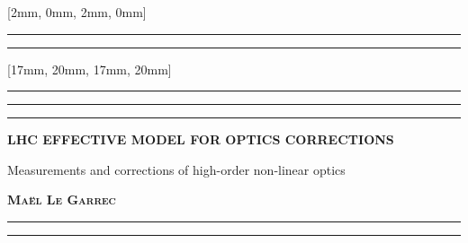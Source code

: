 \documentclass[coverheight=240mm,
               coverwidth=175mm, 
               spinewidth=15mm,
               markcolor=black,
               bleedwidth=0mm,
               marklength=0mm]{bookcover}
\begin{document}
    
\begin{bookcover}


\color{textcolor}


[2mm, 0mm, 2mm, 0mm]{
    \noindent\rule[0.5em]{\partwidth}{1.5pt}
    \vfill
    \vfill
    \noindent\rule[0.5em]{\partwidth}{1.5pt}
}


[17mm, 20mm, 17mm, 20mm] %
{
    \noindent\rule[0.5em]{\partwidth}{1.5pt}\vspace{-22pt}
    \noindent\rule[0.5em]{\partwidth}{1.5pt}\vspace{-22pt}
    \noindent\rule[0.5em]{\partwidth}{1.5pt}
    \vspace{0.5cm}
    \fontsize{31pt}{30pt}\selectfont%
    \begin{flushright}%
        \bfseries
        \MakeUppercase{
            LHC Effective Model for Optics Corrections
        }%
    \end{flushright}
    \vspace{.1em}
    \fontsize{12pt}{15pt}\selectfont%
    \begin{flushright}%
        Measurements and corrections of high-order non-linear optics
    \end{flushright}
    \vfill
    \fontsize{15pt}{0pt}\selectfont%
    \bfseries\noindent\scshape Maël Le Garrec
    \par
    \vspace{0.3em}
    \noindent\rule[0.5em]{\partwidth}{1.5pt}\vspace{-2pt}
    \noindent\rule[0.5em]{\partwidth}{1.5pt}
}



\end{bookcover}
\end{document}
